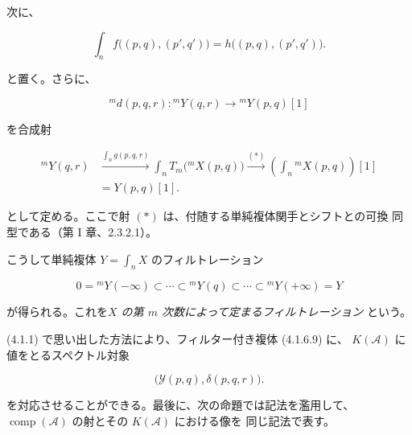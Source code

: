 \clearpage
{}%
\begingroup\small\setlength{\parskip}{0pt}\setlength{\emergencystretch}{1.5em}
\setlength{\abovedisplayskip}{4pt plus 2pt minus 2pt}%
\setlength{\belowdisplayskip}{4pt plus 2pt minus 2pt}%

\noindent 次に、

\begin{equation}
\int_n f\bigl((p,q),(p',q')\bigr)
=h\bigl((p,q),(p',q')\bigr).
\tag{4.1.6.6}
\end{equation}

と置く。さらに、

\begin{equation}
{}^{m}\!d(p,q,r)\colon{}^{m}\!Y(q,r)
\longrightarrow{}^{m}\!Y(p,q)[1]
\tag{4.1.6.7}
\end{equation}

を合成射

\begin{equation}
\begin{aligned}
{}^{m}\!Y(q,r)
&\xrightarrow{\int_n g(p,q,r)}
\int_n T_m\bigl({}^{m}\!X(p,q)\bigr)
\xrightarrow{(*)}
\left(\int_n{}^{m}\!X(p,q)\right)[1]\\
&=Y(p,q)[1].
\end{aligned}
\tag{4.1.6.8}
\end{equation}

として定める。ここで射 $(*)$ は、付随する単純複体関手とシフトとの可換
同型である（第 I 章、2.3.2.1）。

こうして単純複体 $Y=\int_n X$ のフィルトレーション

\begin{equation}
0={}^{m}\!Y(-\infty)\subset\cdots\subset{}^{m}\!Y(q)
\subset\cdots\subset{}^{m}\!Y(+\infty)=Y
\tag{4.1.6.9}
\end{equation}

が得られる。これを\emph{$X$ の第 $m$ 次数によって定まるフィルトレーション}
という。

(4.1.1) で思い出した方法により、フィルター付き複体 (4.1.6.9) に、
$K(\mathcal A)$ に値をとるスペクトル対象

\begin{equation}
\bigl(\mathcal Y(p,q),\delta(p,q,r)\bigr).
\tag{4.1.6.10}
\end{equation}

を対応させることができる。最後に、次の命題では記法を濫用して、
$\operatorname{comp}(\mathcal A)$ の射とその $K(\mathcal A)$ における像を
同じ記法で表す。

